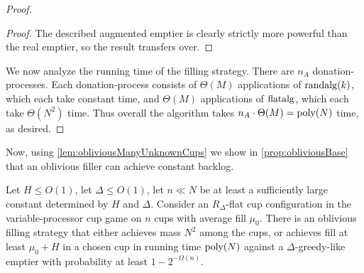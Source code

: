 \begin{proof}
\begin{proof}
  The described augmented emptier is clearly strictly more
  powerful than the real emptier, so the result transfers over.
\end{proof}

We now analyze the running time of the filling strategy.
There are $n_A$ donation-processes. Each donation-process
consists of $\Theta(M)$ applications of $\operatorname{\text{\textup{randalg}}}(k)$, which each take
constant time, and $\Theta(M)$
applications of $\operatorname{\text{\textup{flatalg}}}$, which each take $\Theta(N^2)$ time.
Thus overall the algorithm takes $n_A \cdot \Theta(M) = \operatorname{\text{poly}}(N)$ time, as desired.
  
\end{proof}

Now, using \cref{lem:obliviousManyUnknownCups} we show in
\cref{prop:obliviousBase} that an oblivious filler can achieve
constant backlog. 
\begin{proposition}
  \label{prop:obliviousBase}
  Let $H \le O(1)$, let $\Delta \le O(1)$, let $n\ll N$ be at least a
  sufficiently large constant determined by $H$ and $\Delta$. 
  Consider an $R_\Delta$-flat cup configuration in the variable-processor cup
  game on $n$ cups with average fill $\mu_0$.
  There is an oblivious filling strategy that either
  achieves mass $N^2$ among the cups, or achieves fill at least $\mu_0 + H$
  in a chosen cup in running time $\operatorname{\text{poly}}(N)$ against a
  $\Delta$-greedy-like emptier with probability at least $1-2^{-\Omega(n)}.$
\end{proposition}
